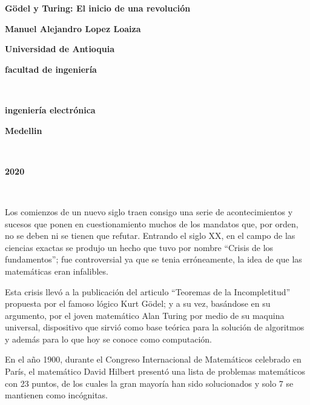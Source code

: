 \documentclass[12pt]{article}
\begin{document}
\begin{center}
\bf{\sc\Large Gödel y Turing: El inicio de una revolución}\\
\end{center}
\vspace{120pt}
\begin{center}
\bf{\sc\Large Manuel Alejandro Lopez Loaiza }\\
\end{center}
\vspace{200pt}
\begin{center}
\bf{\sc\Large Universidad de Antioquia}
\end{center}
\begin{center}
\bf{\sc\Large facultad de ingeniería}\\
\end{center}\
\begin{center}
\bf{\sc\Large ingeniería electrónica}
\end{center}
\begin{center}
\bf{\sc\Large Medellin}\\
\end{center}\
\begin{center}
\bf{\sc\Large 2020}\\
\end{center}\



\newpage
\vspace{10PT}
\large
 Los comienzos de un nuevo siglo traen consigo una serie de acontecimientos y sucesos que ponen en cuestionamiento muchos de los mandatos que, por orden, no se deben ni se tienen que refutar. Entrando el siglo XX, en el campo de las ciencias exactas se produjo un hecho que tuvo por nombre “Crisis de los fundamentos”; fue controversial ya que se tenia erróneamente, la idea de que las matemáticas eran infalibles.

\vspace{10PT}
Esta crisis llevó a la publicación del articulo “Teoremas de la Incompletitud” propuesta por el famoso lógico Kurt Gödel; y a su vez, basándose en su argumento, por el joven matemático Alan Turing por medio de su maquina universal, dispositivo que sirvió como base teórica para la solución de algoritmos y además para lo que hoy se conoce como computación.

\vspace{10PT}
En el año 1900, durante el Congreso Internacional de Matemáticos celebrado en París, el matemático David Hilbert presentó una lista de problemas matemáticos con 23 puntos, de los cuales la gran mayoría han sido solucionados y solo 7 se mantienen como incógnitas. 
\end{document}
